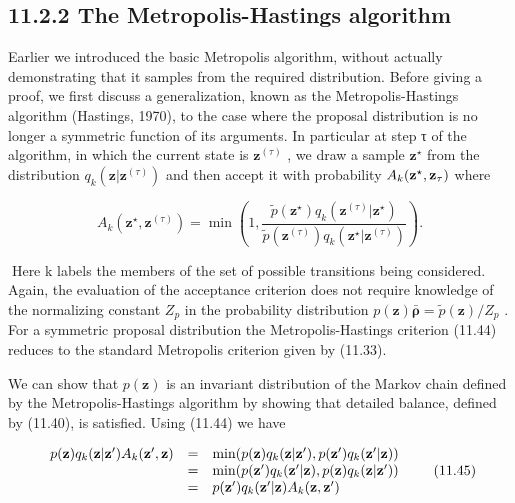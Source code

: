 \documentclass[
  10
]{article}
\begin{document}
\subsection{11.2.2 The Metropolis-Hastings
algorithm}\label{the-metropolis-hastings-algorithm}

Earlier we introduced the basic Metropolis algorithm, without actually
demonstrating that it samples from the required distribution. Before
giving a proof, we first discuss a generalization, known as the
Metropolis-Hastings algorithm (Hastings, 1970), to the case where the
proposal distribution is no longer a symmetric function of its
arguments. In particular at step τ of the algorithm, in which the
current state is \(\mathbf { z } ^ { ( \tau ) }\) , we draw a sample
\(\mathbf { z } ^ { \star }\) from the distribution
\(q _ { k } ( \mathbf { z } | \mathbf { z } ^ { ( \tau ) } )\) and then
accept it with probability
\(A _ { k } ( { \bf z } ^ { \star } , { \bf z } _ { \tau } )\) where

\[
A _ {k} (\mathbf {z} ^ {\star}, \mathbf {z} ^ {(\tau)}) = \min \left(1, \frac {\widetilde {p} (\mathbf {z} ^ {\star}) q _ {k} (\mathbf {z} ^ {(\tau)} | \mathbf {z} ^ {\star})}{\widetilde {p} (\mathbf {z} ^ {(\tau)}) q _ {k} (\mathbf {z} ^ {\star} | \mathbf {z} ^ {(\tau)})}\right).\tag{11.44}
\]

Here k labels the members of the set of possible transitions being
considered. Again, the evaluation of the acceptance criterion does not
require knowledge of the normalizing constant \(Z _ { p }\) in the
probability distribution
\(p ( \mathbf { z } ) \bar { \mathbf { \rho } } = \widetilde { p } ( \mathbf { z } ) / Z _ { p }\)
. For a symmetric proposal distribution the Metropolis-Hastings
criterion (11.44) reduces to the standard Metropolis criterion given by
(11.33).

We can show that \(p ( \mathbf { z } )\) is an invariant distribution of
the Markov chain defined by the Metropolis-Hastings algorithm by showing
that detailed balance, defined by (11.40), is satisfied. Using (11.44)
we have

\[
\begin{array}{r c l} p (\mathbf {z}) q _ {k} (\mathbf {z} | \mathbf {z} ^ {\prime}) A _ {k} (\mathbf {z} ^ {\prime}, \mathbf {z}) & = & \min (p (\mathbf {z}) q _ {k} (\mathbf {z} | \mathbf {z} ^ {\prime}), p (\mathbf {z} ^ {\prime}) q _ {k} (\mathbf {z} ^ {\prime} | \mathbf {z})) \\ & = & \min (p (\mathbf {z} ^ {\prime}) q _ {k} (\mathbf {z} ^ {\prime} | \mathbf {z}), p (\mathbf {z}) q _ {k} (\mathbf {z} | \mathbf {z} ^ {\prime})) \\ & = & p (\mathbf {z} ^ {\prime}) q _ {k} (\mathbf {z} ^ {\prime} | \mathbf {z}) A _ {k} (\mathbf {z}, \mathbf {z} ^ {\prime}) \end{array}\tag{11.45}
\]
\end{document}
